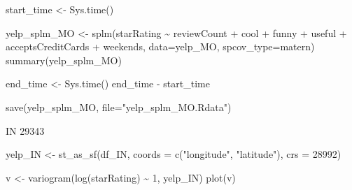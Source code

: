 \documentclass[
  12pt,
  letterpaper,
  DIV=11,
  numbers=noendperiod]{scrartcl}
\newenvironment{Shaded}{\begin{snugshade}}{\end{snugshade}}
\newcommand{\AttributeTok}[1]{\textcolor[rgb]{0.98,0.46,0.51}{#1}}
\newcommand{\DecValTok}[1]{\textcolor[rgb]{0.47,0.72,1.00}{#1}}
\newcommand{\FunctionTok}[1]{\textcolor[rgb]{0.70,0.57,0.94}{#1}}
\newcommand{\NormalTok}[1]{\textcolor[rgb]{0.88,0.89,0.91}{#1}}
\newcommand{\OtherTok}[1]{\textcolor[rgb]{0.70,0.57,0.94}{#1}}
\newcommand{\SpecialCharTok}[1]{\textcolor[rgb]{0.47,0.72,1.00}{#1}}
\newcommand{\StringTok}[1]{\textcolor[rgb]{0.62,0.80,1.00}{#1}}
\begin{document}
\begin{Shaded}
\begin{Highlighting}[]
\NormalTok{start\_time }\OtherTok{\textless{}{-}} \FunctionTok{Sys.time}\NormalTok{()}


\NormalTok{yelp\_splm\_MO }\OtherTok{\textless{}{-}} \FunctionTok{splm}\NormalTok{(starRating }\SpecialCharTok{\textasciitilde{}}\NormalTok{ reviewCount }\SpecialCharTok{+}\NormalTok{ cool }\SpecialCharTok{+}\NormalTok{ funny }\SpecialCharTok{+}\NormalTok{ useful }\SpecialCharTok{+}\NormalTok{ acceptsCreditCards }\SpecialCharTok{+}\NormalTok{ weekends, }\AttributeTok{data=}\NormalTok{yelp\_MO, }\AttributeTok{spcov\_type=}\StringTok{\textquotesingle{}matern\textquotesingle{}}\NormalTok{)}
\FunctionTok{summary}\NormalTok{(yelp\_splm\_MO)}

\NormalTok{end\_time }\OtherTok{\textless{}{-}} \FunctionTok{Sys.time}\NormalTok{()}
\NormalTok{end\_time }\SpecialCharTok{{-}}\NormalTok{ start\_time}
\end{Highlighting}
\end{Shaded}

\begin{Shaded}
\begin{Highlighting}[]
\FunctionTok{save}\NormalTok{(yelp\_splm\_MO, }\AttributeTok{file=}\StringTok{"yelp\_splm\_MO.Rdata"}\NormalTok{)}
\end{Highlighting}
\end{Shaded}

IN 29343

\begin{Shaded}
\begin{Highlighting}[]
\NormalTok{yelp\_IN }\OtherTok{\textless{}{-}} \FunctionTok{st\_as\_sf}\NormalTok{(df\_IN, }\AttributeTok{coords =} \FunctionTok{c}\NormalTok{(}\StringTok{"longitude"}\NormalTok{, }\StringTok{"latitude"}\NormalTok{), }\AttributeTok{crs =} \DecValTok{28992}\NormalTok{)}
\end{Highlighting}
\end{Shaded}

\begin{Shaded}
\begin{Highlighting}[]
\NormalTok{v }\OtherTok{\textless{}{-}} \FunctionTok{variogram}\NormalTok{(}\FunctionTok{log}\NormalTok{(starRating) }\SpecialCharTok{\textasciitilde{}} \DecValTok{1}\NormalTok{, yelp\_IN)}
\FunctionTok{plot}\NormalTok{(v)}
\end{Highlighting}
\end{Shaded}
\end{document}
